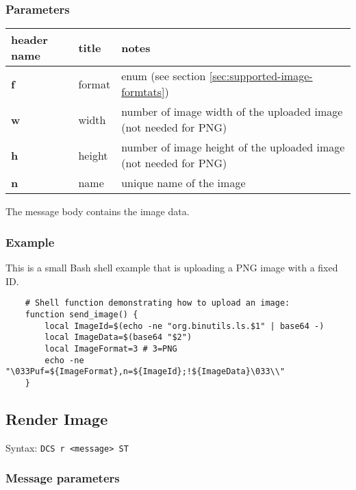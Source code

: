 \documentclass[a4paper]{article}
\newcommand{\code}[1]{\colorbox{light-gray}{\texttt{#1}}}
\begin{document}
\subsubsection*{Parameters}

\begin{tabular}{ |l|l|l| }
    \hline
    \textbf{header name}   & \textbf{title}   & \textbf{notes} \\
    \hline
    \textbf{f}       & format & enum (see section \ref{sec:supported-image-formtats}) \\
    \textbf{w}       & width & number of image width of the uploaded image (not needed for PNG) \\
    \textbf{h}       & height & number of image height of the uploaded image (not needed for PNG) \\
    \textbf{n}       & name & unique name of the image \\
    \hline
\end{tabular}

The message body contains the image data.

\subsubsection*{Example}

This is a small Bash shell example that is uploading a PNG image with a fixed ID.

\begin{verbatim}
    # Shell function demonstrating how to upload an image:
    function send_image() {
        local ImageId=$(echo -ne "org.binutils.ls.$1" | base64 -)
        local ImageData=$(base64 "$2")
        local ImageFormat=3 # 3=PNG
        echo -ne "\033Puf=${ImageFormat},n=${ImageId};!${ImageData}\033\\"
    }
\end{verbatim}

\pagebreak

\subsection{Render Image} %

Syntax: \code{DCS r <message> ST}

\subsubsection*{Message parameters}
\end{document}
